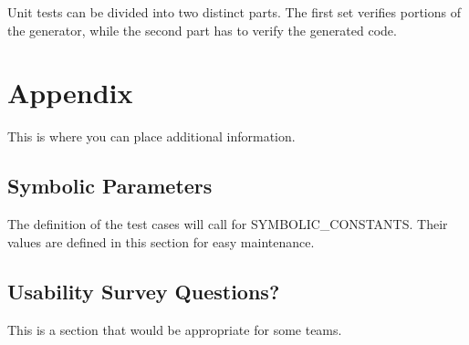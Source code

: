 \documentclass[12pt, titlepage]{article}
\begin{document}
Unit tests can be divided into two distinct parts. The first set verifies 
portions of the generator, while the second part has to verify the generated 
code.







\newpage

\section{Appendix}

This is where you can place additional information.

\subsection{Symbolic Parameters}

The definition of the test cases will call for SYMBOLIC\_CONSTANTS.
Their values are defined in this section for easy maintenance.

\subsection{Usability Survey Questions?}

This is a section that would be appropriate for some teams.
\end{document}
